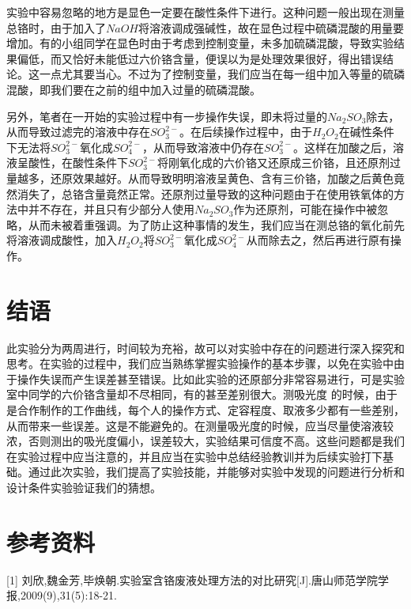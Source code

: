 \documentclass[UTF8,a4paper,11pt,twocolumn]{ctexart}
\begin{document}
实验中容易忽略的地方是显色一定要在酸性条件下进行。这种问题一般出现在测量总铬时，由于加入了$NaOH$将溶液调成强碱性，故在显色过程中硫磷混酸的用量要增加。有的小组同学在显色时由于考虑到控制变量，未多加硫磷混酸，导致实验结果偏低，而又恰好未能低过六价铬含量，便误以为是处理效果很好，得出错误结论。这一点尤其要当心。不过为了控制变量，我们应当在每一组中加入等量的硫磷混酸，即我们要在之前的组中加入过量的硫磷混酸。

另外，笔者在一开始的实验过程中有一步操作失误，即未将过量的$Na_2SO_3$除去，从而导致过滤完的溶液中存在$SO_3^{2-}$。在后续操作过程中，由于$H_2O_2$在碱性条件下无法将$SO_3^{2-}$氧化成$SO_4^{2-}$，从而导致溶液中仍存在$SO_3^{2-}$。这样在加酸之后，溶液呈酸性，在酸性条件下$SO_3^{2-}$将刚氧化成的六价铬又还原成三价铬，且还原剂过量越多，还原效果越好。从而导致明明溶液呈黄色、含有三价铬，加酸之后黄色竟然消失了，总铬含量竟然正常。还原剂过量导致的这种问题由于在使用铁氧体的方法中并不存在，并且只有少部分人使用$Na_2SO_3$作为还原剂，可能在操作中被忽略，从而未被着重强调。为了防止这种事情的发生，我们应当在测总铬的氧化前先将溶液调成酸性，加入$H_2O_2$将$SO_3^{2-}$氧化成$SO_4^{2-}$从而除去之，然后再进行原有操作。

\section{结语}
此实验分为两周进行，时间较为充裕，故可以对实验中存在的问题进行深入探究和思考。在实验的过程中，我们应当熟练掌握实验操作的基本步骤，以免在实验中由于操作失误而产生误差甚至错误。比如此实验的还原部分非常容易进行，可是实验室中同学的六价铬含量却不尽相同，有的甚至差别很大。测吸光度 \newpage \noindent{}的时候，由于是合作制作的工作曲线，每个人的操作方式、定容程度、取液多少都有一些差别，从而带来一些误差。这是不能避免的。在测量吸光度的时候，应当尽量使溶液较浓，否则测出的吸光度偏小，误差较大，实验结果可信度不高。这些问题都是我们在实验过程中应当注意的，并且应当在实验中总结经验教训并为后续实验打下基础。通过此次实验，我们提高了实验技能，并能够对实验中发现的问题进行分析和设计条件实验验证我们的猜想。

\section{参考资料}
\noindent{}[1] 刘欣,魏金芳,毕焕朝.实验室含铬废液处理方法的对比研究[J].唐山师范学院学报,2009(9),31(5):18-21.
\end{document}
